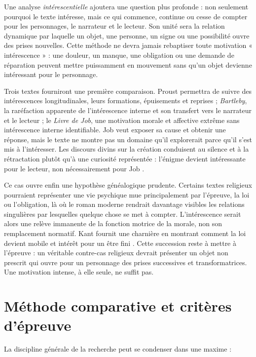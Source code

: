 \documentclass[11pt,a4paper]{article}
\begin{document}
Une analyse \emph{intérescentielle} ajoutera une question plus profonde : non
seulement pourquoi le texte intéresse, mais ce qui commence, continue ou cesse
de compter pour les personnages, le narrateur et le lecteur. Son unité sera la
relation dynamique par laquelle un objet, une personne, un signe ou une
possibilité ouvre des prises nouvelles. Cette méthode ne devra jamais rebaptiser
toute motivation « intérescence » : une douleur, un manque, une obligation ou
une demande de réparation peuvent mettre puissamment en mouvement sans qu'un
objet devienne intéressant pour le personnage.

Trois textes fourniront une première comparaison. Proust permettra de suivre
des intérescences longitudinales, leurs formations, épuisements et reprises ;
\emph{Bartleby}, la raréfaction apparente de l'intérescence interne et son
transfert vers le narrateur et le lecteur ; le \emph{Livre de Job}, une
motivation morale et affective extrême sans intérescence interne identifiable.
Job veut exposer sa cause et obtenir une réponse, mais le texte ne montre pas un
domaine qu'il explorerait parce qu'il s'est mis à l'intéresser. Les discours
divins sur la création conduisent au silence et à la rétractation plutôt qu'à
une curiosité représentée : l'énigme devient intéressante pour le lecteur, non
nécessairement pour Job \parencite{jps1985tanakh}.

Ce cas ouvre enfin une hypothèse généalogique prudente. Certains textes
religieux pourraient représenter une vie psychique mue principalement par
l'épreuve, la loi ou l'obligation, là où le roman moderne rendrait davantage
visibles les relations singulières par lesquelles quelque chose se met à
compter. L'intérescence serait alors une relève immanente de la fonction motrice
de la morale, non son remplacement normatif. Kant fournit une charnière en
montrant comment la loi devient mobile et intérêt pour un être fini
\parencite{kant1848moralepratique}. Cette succession reste à mettre à l'épreuve :
un véritable contre-cas religieux devrait présenter un objet non prescrit qui
ouvre pour un personnage des prises successives et transformatrices. Une
motivation intense, à elle seule, ne suffit pas.

\section{Méthode comparative et critères d'épreuve}

La discipline générale de la recherche peut se condenser dans une maxime :
\end{document}
